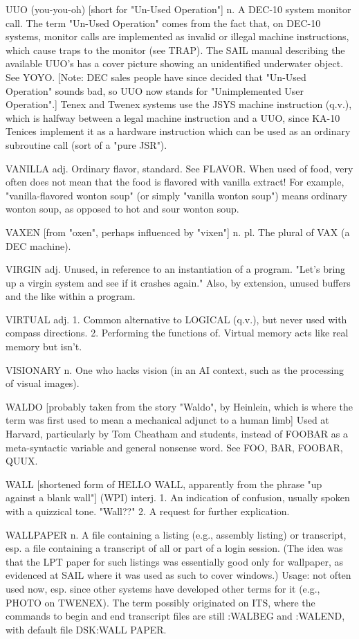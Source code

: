 UUO (you-you-oh) [short for "Un-Used Operation"] n. A DEC-10 system
   monitor call.  The term "Un-Used Operation" comes from the fact
   that, on DEC-10 systems, monitor calls are implemented as invalid
   or illegal machine instructions, which cause traps to the monitor
   (see TRAP).	The SAIL manual describing the available UUO's has a
   cover picture showing an unidentified underwater object.  See YOYO.
   [Note: DEC sales people have since decided that "Un-Used Operation"
   sounds bad, so UUO now stands for "Unimplemented User Operation".]
   Tenex and Twenex systems use the JSYS machine instruction (q.v.),
   which is halfway between a legal machine instruction and a UUO,
   since KA-10 Tenices implement it as a hardware instruction which
   can be used as an ordinary subroutine call (sort of a "pure JSR").

VANILLA adj. Ordinary flavor, standard.	 See FLAVOR.  When used of
   food, very often does not mean that the food is flavored with
   vanilla extract!  For example, "vanilla-flavored wonton soup" (or
   simply "vanilla wonton soup") means ordinary wonton soup, as
   opposed to hot and sour wonton soup.

VAXEN [from "oxen", perhaps influenced by "vixen"] n. pl. The plural
   of VAX (a DEC machine).

VIRGIN adj. Unused, in reference to an instantiation of a program.
   "Let's bring up a virgin system and see if it crashes again."
   Also, by extension, unused buffers and the like within a program.

VIRTUAL adj. 1. Common alternative to LOGICAL (q.v.), but never used
   with compass directions.  2.	 Performing the functions of.  Virtual
   memory acts like real memory but isn't.

VISIONARY n. One who hacks vision (in an AI context, such as the
   processing of visual images).

WALDO [probably taken from the story "Waldo", by Heinlein, which is
   where the term was first used to mean a mechanical adjunct to a
   human limb] Used at Harvard, particularly by Tom Cheatham and
   students, instead of FOOBAR as a meta-syntactic variable and
   general nonsense word.  See FOO, BAR, FOOBAR, QUUX.

WALL [shortened form of HELLO WALL, apparently from the phrase "up
   against a blank wall"] (WPI) interj. 1. An indication of confusion,
   usually spoken with a quizzical tone.  "Wall??"  2. A request for
   further explication.

WALLPAPER n. A file containing a listing (e.g., assembly listing) or
   transcript, esp. a file containing a transcript of all or part of a
   login session.  (The idea was that the LPT paper for such listings
   was essentially good only for wallpaper, as evidenced at SAIL where
   it was used as such to cover windows.)  Usage: not often used now,
   esp. since other systems have developed other terms for it (e.g.,
   PHOTO on TWENEX).  The term possibly originated on ITS, where the
   commands to begin and end transcript files are still :WALBEG and
   :WALEND, with default file DSK:WALL PAPER.

